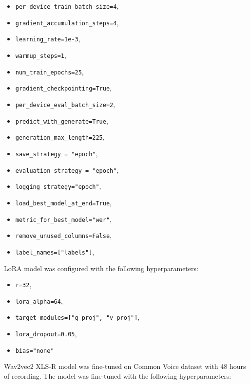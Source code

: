 \documentclass[conference]{IEEEtran}
\begin{document}
\begin{itemize}
    \item \texttt{per\_device\_train\_batch\_size=4},
    \item \texttt{gradient\_accumulation\_steps=4},
    \item \texttt{learning\_rate=1e-3},
    \item \texttt{warmup\_steps=1},
    \item \texttt{num\_train\_epochs=25},
    \item \texttt{gradient\_checkpointing=True},
    \item \texttt{per\_device\_eval\_batch\_size=2},
    \item \texttt{predict\_with\_generate=True},
    \item \texttt{generation\_max\_length=225},
    \item \texttt{save\_strategy = "epoch"},
    \item \texttt{evaluation\_strategy = "epoch"},
    \item \texttt{logging\_strategy="epoch"},
    \item \texttt{load\_best\_model\_at\_end=True},
    \item \texttt{metric\_for\_best\_model="wer"},
    \item \texttt{remove\_unused\_columns=False},  
    \item \texttt{label\_names=["labels"]}, 
    \end{itemize}
    
    \vspace{10pt}
    
    LoRA model was configured with the following hyperparameters:
    
    \begin{itemize}
    \item \texttt{r=32},
    \item \texttt{lora\_alpha=64},
    \item \texttt{target\_modules=["q\_proj", "v\_proj"]},
    \item \texttt{lora\_dropout=0.05},
    \item \texttt{bias="none"}
    \end{itemize}

Wav2vec2 XLS-R model was fine-tuned on Common Voice dataset with 48 hours of recording. The model was fine-tuned with the following hyperparameters:
\end{document}
